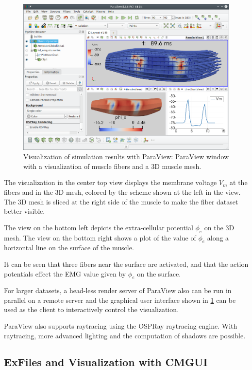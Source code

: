 \begin{figure}%
  \centering%
  \includegraphics[width=\textwidth]{images/implementation/paraview.png}%
  \caption{Visualization of simulation results with ParaView: ParaView window with a visualization of muscle fibers and a 3D muscle mesh.}%
  \label{fig:paraview_output}%
\end{figure}%

The visualization in the center top view displays the membrane voltage $V_m$ at the fibers and in the 3D mesh, colored by the scheme shown at the left in the view. The 3D mesh is sliced at the right side of the muscle to make the fiber dataset better visible.

The view on the bottom left depicts the extra-cellular potential $\phi_e$ on the 3D mesh. The view on the bottom right shows a plot of the value of $\phi_e$ along a horizontal line on the surface of the muscle.

It can be seen that three fibers near the surface are activated, and that the action potentials effect the EMG value given by $\phi_e$ on the surface.

For larger datasets, a head-less render server of ParaView also can be run in parallel on a remote server and the graphical user interface shown in \cref{fig:paraview_output} can be used as the client to interactively control the visualization.

ParaView also supports raytracing using the OSPRay raytracing engine. With raytracing, more advanced lighting and the computation of shadows are possible.

\subsection{ExFiles and Visualization with CMGUI}

